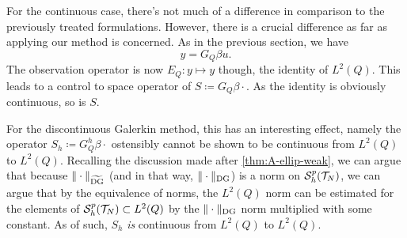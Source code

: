 \documentclass[../thesis.tex]{subfiles}
\begin{document}
For the continuous case, there's not much of a difference in comparison to the previously treated formulations.
However, there is a crucial difference as far as applying our method is concerned.
As in the previous section, we have
\[
	y = G_Q \beta u.
\]
The observation operator is now $E_Q : y \mapsto y$ though, the identity of $L^2(Q)$. This leads to a control to space operator of $S \coloneqq G_Q \beta \cdot$. As the identity is obviously continuous, so is $S$.

For the discontinuous Galerkin method, this has an interesting effect, namely the operator $S_h \coloneqq G_Q^h \beta \cdot$ ostensibly cannot be shown to be continuous from $L^2(Q)$ to $L^2(Q)$.
Recalling the discussion made after \cref{thm:A-ellip-weak}, we can argue that because $\| \cdot \|_{\widetilde{\mathrm{DG}}}$ (and in that way, $\| \cdot \|_{\mathrm{DG}}$) is a norm on $\mathcal{S}_h^p(\mathcal{T}_N)$, we can argue that by the equivalence of norms, the $L^2(Q)$ norm can be estimated for the elements of $\mathcal{S}_h^p(\mathcal{T}_N) \subset L^2(Q)$ by the $\| \cdot \|_{\mathrm{DG}}$ norm multiplied with some constant.
As of such, $S_h$ \emph{is} continuous from $L^2(Q)$ to $L^2(Q)$.
\end{document}
